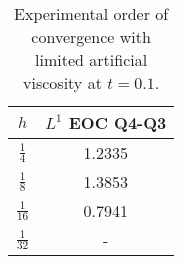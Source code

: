 \begin{table}
	\centering
	\begin{tabular}{|c|c|}
		\hline
		$h$ & $L^1$ EOC Q4-Q3 \\
		\hline\hline
		$\frac{1}{4}$ & 1.2335\\
		\hline
		$\frac{1}{8}$ & 1.3853\\
		\hline
		$\frac{1}{16}$ & 0.7941\\
		\hline
		$\frac{1}{32}$ & -\\
		\hline
	\end{tabular}
	\caption{Experimental order of convergence with limited artificial viscosity at $t=0.1$.}
	\label{{tab:eoc_Q{q}_Q{k}}}
\end{table}
